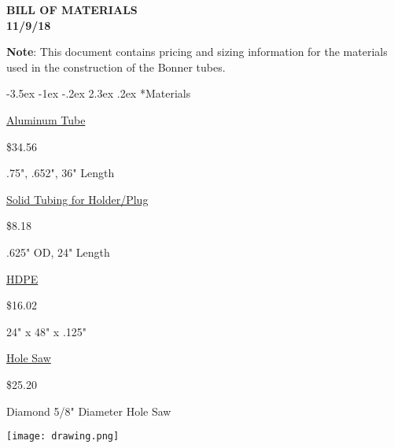 \documentclass[10pt]{article}
\makeatletter
\renewcommand\section{\@startsection{section}{1}{\z@}%
                                  {-3.5ex \@plus -1ex \@minus -.2ex}%
                                  {2.3ex \@plus.2ex}%
                                  {\normalfont\bfseries}}
\makeatother
\begin{document}
{\large
  \begin{center}
    {\bf BILL OF MATERIALS  \\ 
         11/9/18 \\
    }
  \end{center}
}
 
{\small {\bf Note}:
This document contains pricing and sizing information for the materials used in the construction of the Bonner tubes.}

\section*{Materials}

\href{https://www.onlinemetals.com/merchant.cfm?pid=12805&step=4&showunits=inches&id=946&top_cat=60}{Aluminum Tube}

\$34.56

.75", .652", 36" Length

\vspace{1cm}

\href{https://www.onlinemetals.com/merchant.cfm?pid=7685&step=4&showunits=inches&id=288&top_cat=60}{Solid Tubing for Holder/Plug}

\$8.18

.625" OD, 24" Length

\vspace{1cm}

\href{https://www.eplastics.com/HDPEBLK0125SR24X48}{HDPE}

\$16.02

24" x 48" x .125"

\vspace{1cm}

\href{https://www.grainger.com/product/MORSE-5-8-Dia-Hole-Saw-for-Masonry-40L157}{Hole Saw}

\$25.20

Diamond 5/8" Diameter Hole Saw 

\texttt{[image: drawing.png]}
\end{document}
